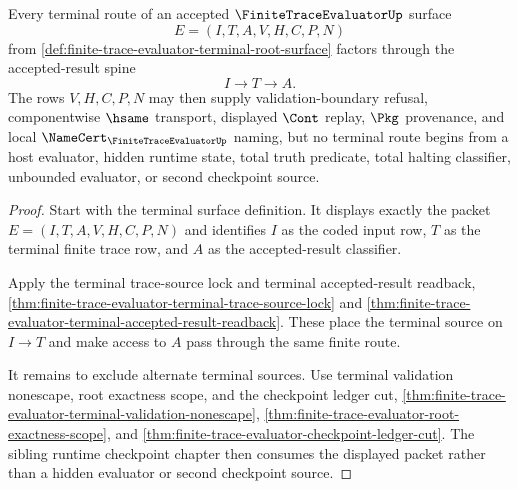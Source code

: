 \begin{theorem}
\label{thm:finitetrace-evaluator-terminal-route-totality}
Every terminal route of an accepted $\FiniteTraceEvaluatorUp$ surface
$$
E=(I,T,A,V,H,C,P,N)
$$
from \autoref{def:finite-trace-evaluator-terminal-root-surface} factors
through the accepted-result spine
$$
I \to T \to A.
$$
The rows $V,H,C,P,N$ may then supply validation-boundary refusal,
componentwise $\hsame$ transport, displayed $\Cont$ replay, $\Pkg$
provenance, and local $\NameCert_{\FiniteTraceEvaluatorUp}$ naming, but no
terminal route begins from a host evaluator, hidden runtime state, total truth
predicate, total halting classifier, unbounded evaluator, or second checkpoint
source.
\end{theorem}
\begin{proof}
Start with the terminal surface definition. It displays exactly the packet
$E=(I,T,A,V,H,C,P,N)$ and identifies $I$ as the coded input row, $T$ as the
terminal finite trace row, and $A$ as the accepted-result classifier.

Apply the terminal trace-source lock and terminal accepted-result readback,
\autoref{thm:finite-trace-evaluator-terminal-trace-source-lock} and
\autoref{thm:finite-trace-evaluator-terminal-accepted-result-readback}. These
place the terminal source on $I \to T$ and make access to $A$ pass through the
same finite route.

It remains to exclude alternate terminal sources. Use terminal validation
nonescape, root exactness scope, and the checkpoint ledger cut,
\autoref{thm:finite-trace-evaluator-terminal-validation-nonescape},
\autoref{thm:finite-trace-evaluator-root-exactness-scope}, and
\autoref{thm:finite-trace-evaluator-checkpoint-ledger-cut}. The sibling
runtime checkpoint chapter then consumes the displayed packet rather than a
hidden evaluator or second checkpoint source.
\end{proof}

